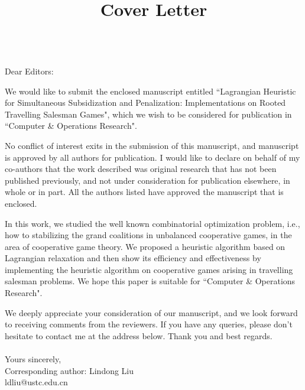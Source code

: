 \documentclass[12pt]{article}
\title{Cover Letter}
\date{}
\begin{document}
\maketitle
~\\
Dear Editors:


We would like to submit the enclosed manuscript entitled ``Lagrangian Heuristic for Simultaneous Subsidization and Penalization: Implementations on Rooted Travelling Salesman Games", which we wish to be considered for publication in ``Computer \& Operations Research". 

No conflict of interest exits in the submission of this manuscript, and manuscript is approved by all authors for publication. I would like to declare on behalf of my co-authors that the work described was original research that has not been published previously, and not under consideration for publication elsewhere, in whole or in part. All the authors listed have approved the manuscript that is enclosed.

In this work, we studied the well known combinatorial optimization problem, i.e., how to stabilizing the grand coalitions in unbalanced cooperative games, in the area of cooperative game theory.
We proposed a heuristic algorithm based on Lagrangian relaxation and then show its efficiency and effectiveness by implementing the heuristic algorithm on cooperative games arising in travelling salesman problems.
We hope this paper is suitable for ``Computer \& Operations Research".


We deeply appreciate your consideration of our manuscript, and we look forward to receiving comments from the reviewers. If you have any queries, please don't hesitate to contact me at the address below.
Thank you and best regards.
~\\
~\\
Yours sincerely,\\
Corresponding author: Lindong Liu\\
ldliu@ustc.edu.cn
\end{document}
